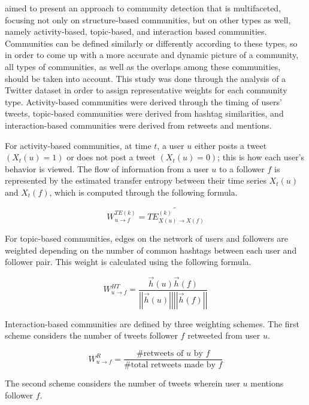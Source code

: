 aimed to present an approach to community detection that is multifaceted, focusing not only on structure-based communities, but on other types as well, namely activity-based, topic-based, and interaction based communities. Communities can be defined similarly or differently according to these types, so in order to come up with a more accurate and dynamic picture of a community, all types of communities, as well as the overlaps among these communities, should be taken into account. This study was done through the analysis of a Twitter dataset in order to assign representative weights for each community type. Activity-based communities were derived through the timing of users' tweets, topic-based communities were derived from hashtag similarities, and interaction-based communities were derived from retweets and mentions.

For activity-based communities, at time $t$, a user $u$ either posts a tweet $(X_{t}(u) = 1)$ or does not post a tweet $(X_{t}(u) = 0)$; this is how each user’s behavior is viewed. The flow of information from a user $u$ to a follower $f$ is represented by the estimated transfer entropy between their time series $X_{t}(u)$ and $X_{t}(f)$, which is computed through the following formula.

\begin{equation}
W_{u \to f}^{TE(k)} = \tilde{TE_{X(u) \to X(f)}^{(k)}} 
\end{equation}

For topic-based communities, edges on the network of users and followers are weighted depending on the number of common hashtags between each user and follower pair. This weight is calculated using the following formula.

\begin{equation}
W_{u \to f}^{HT} = \frac{\vec{h}(u)\vec{h}(f)}{\left|{\left|{\vec{h}(u)}\right|}\right| \left|{\left|{\vec{h}(f)}\right|}\right|}
\end{equation}

Interaction-based communities are defined by three weighting schemes. The first scheme considers the number of tweets follower $f$ retweeted from user $u$.

\begin{equation}
W_{u \to f}^{R} = \frac{\text{\# retweets of $u$ by $f$}}{\text{\# total retweets made by $f$}}
\end{equation}

The second scheme considers the number of tweets wherein user $u$ mentions follower $f$.

